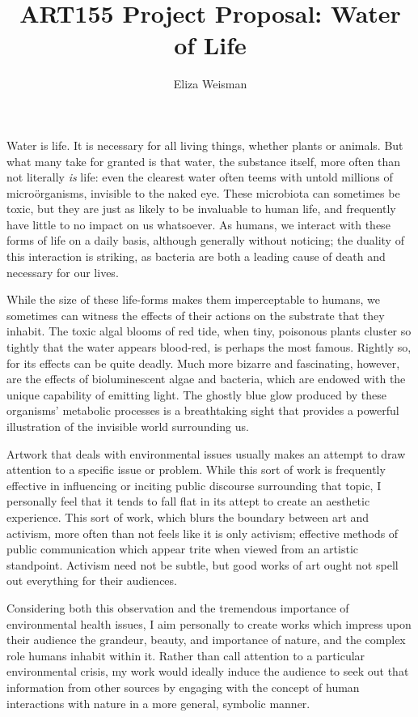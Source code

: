 \documentclass[a4paper,nobib]{tufte-handout}
\title{\textbf{ART155 Project Proposal:} Water of Life}
\author{Eliza Weisman}
\begin{document}
\maketitle
\doublespacing

Water is life. It is necessary for all living things, whether plants or animals. But what many take for granted is that water, the substance itself, more often than not literally \textit{is} life: even the clearest water often teems with untold millions of micro{\"o}rganisms, invisible to the naked eye. These microbiota can sometimes be toxic, but they are just as likely to be invaluable to human life, and frequently have little to no impact on us whatsoever. As humans, we interact with these forms of life on a daily basis, although generally without noticing; the duality of this interaction is striking, as bacteria are both a leading cause of death and necessary for our lives.

While the size of these life-forms makes them imperceptable to humans, we sometimes can witness the effects of their actions on the substrate that they inhabit. The toxic algal blooms of red tide, when tiny, poisonous plants cluster so tightly that the water appears blood-red, is perhaps the most famous. Rightly so, for its effects can be quite deadly. Much more bizarre and fascinating, however, are the effects of bioluminescent algae and bacteria, which are endowed with the unique capability of emitting light. The ghostly blue glow produced by these organisms' metabolic processes is a breathtaking sight that provides a powerful illustration of the invisible world surrounding us.

Artwork that deals with environmental issues usually makes an attempt to draw attention to a specific issue or problem. While this sort of work is frequently effective in influencing or inciting public discourse surrounding that topic, I personally feel that it tends to fall flat in its attept to create an aesthetic experience. This sort of work, which blurs the boundary between art and activism, more often than not feels like it is only activism; effective methods of public communication which appear trite when viewed from an artistic standpoint. Activism need not be subtle, but good works of art ought not spell out everything for their audiences.

Considering both this observation and the tremendous importance of environmental health issues, I aim personally to create works which impress upon their audience the grandeur, beauty, and importance of nature, and the complex role humans inhabit within it. Rather than call attention to a particular environmental crisis, my work would ideally induce the audience to seek out that information from other sources by engaging with the concept of human interactions with nature in a more general, symbolic manner.
\end{document}
